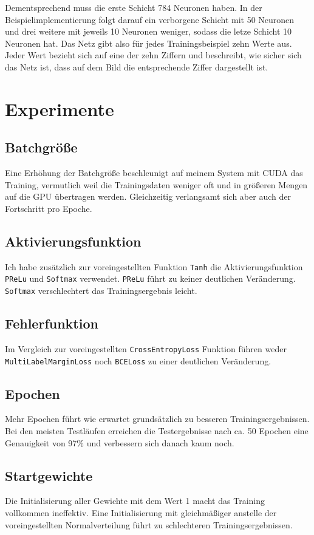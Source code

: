 \documentclass[12pt, a4paper]{report}
\begin{document}
Dementsprechend muss die erste Schicht 784 Neuronen haben. In der Beispielimplementierung folgt darauf ein verborgene Schicht mit 50 Neuronen und drei weitere mit jeweils 10 Neuronen weniger, sodass die letze Schicht 10 Neuronen hat.
Das Netz gibt also für jedes Trainingsbeispiel zehn Werte aus.
Jeder Wert bezieht sich auf eine der zehn Ziffern und beschreibt, wie sicher sich das Netz ist, dass auf dem Bild die entsprechende Ziffer dargestellt ist.

\section{Experimente}

\subsection{Batchgröße}

Eine Erhöhung der Batchgröße beschleunigt auf meinem System mit CUDA das Training, vermutlich weil die Trainingsdaten weniger oft und in größeren Mengen auf die GPU übertragen werden. Gleichzeitig verlangsamt sich aber auch der Fortschritt pro Epoche.

\subsection{Aktivierungsfunktion}

Ich habe zusätzlich zur voreingestellten Funktion \texttt{Tanh} die Aktivierungsfunktion \texttt{PReLu} und \texttt{Softmax} verwendet. \texttt{PReLu} führt zu keiner deutlichen Veränderung. \texttt{Softmax} verschlechtert das Trainingsergebnis leicht.

\subsection{Fehlerfunktion}

Im Vergleich zur voreingestellten \texttt{CrossEntropyLoss} Funktion führen weder \\\texttt{MultiLabelMarginLoss} noch \texttt{BCELoss} zu einer deutlichen Veränderung.

\subsection{Epochen}

Mehr Epochen führt wie erwartet grundsätzlich zu besseren Trainingsergebnissen. Bei den meisten Testläufen erreichen die Testergebnisse nach ca. 50 Epochen eine Genauigkeit von 97\% und verbessern sich danach kaum noch.

\subsection{Startgewichte}

Die Initialisierung aller Gewichte mit dem Wert 1 macht das Training vollkommen ineffektiv. Eine Initialisierung mit gleichmäßiger anstelle der voreingestellten Normalverteilung führt zu schlechteren Trainingsergebnissen.
\end{document}
